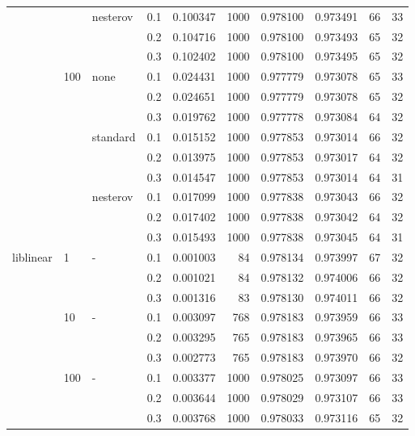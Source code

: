 \begin{table}[H]
\begin{tabular}{llllrrrrrr}
          &     & nesterov & 0.1 &  0.100347 &    1000 &  0.978100 &  0.973491 &          66 &        33 \\
          &     &   & 0.2 &  0.104716 &    1000 &  0.978100 &  0.973493 &          65 &        32 \\
          &     &   & 0.3 &  0.102402 &    1000 &  0.978100 &  0.973495 &          65 &        32 \\
          & 100 & none & 0.1 &  0.024431 &    1000 &  0.977779 &  0.973078 &          65 &        33 \\
          &     &   & 0.2 &  0.024651 &    1000 &  0.977779 &  0.973078 &          65 &        32 \\
          &     &   & 0.3 &  0.019762 &    1000 &  0.977778 &  0.973084 &          64 &        32 \\
          &     & standard & 0.1 &  0.015152 &    1000 &  0.977853 &  0.973014 &          66 &        32 \\
          &     &   & 0.2 &  0.013975 &    1000 &  0.977853 &  0.973017 &          64 &        32 \\
          &     &   & 0.3 &  0.014547 &    1000 &  0.977853 &  0.973014 &          64 &        31 \\
          &     & nesterov & 0.1 &  0.017099 &    1000 &  0.977838 &  0.973043 &          66 &        32 \\
          &     &   & 0.2 &  0.017402 &    1000 &  0.977838 &  0.973042 &          64 &        32 \\
          &     &   & 0.3 &  0.015493 &    1000 &  0.977838 &  0.973045 &          64 &        31 \\
liblinear & 1   & - & 0.1 &  0.001003 &      84 &  0.978134 &  0.973997 &          67 &        32 \\
          &     &   & 0.2 &  0.001021 &      84 &  0.978132 &  0.974006 &          66 &        32 \\
          &     &   & 0.3 &  0.001316 &      83 &  0.978130 &  0.974011 &          66 &        32 \\
          & 10  & - & 0.1 &  0.003097 &     768 &  0.978183 &  0.973959 &          66 &        33 \\
          &     &   & 0.2 &  0.003295 &     765 &  0.978183 &  0.973965 &          66 &        33 \\
          &     &   & 0.3 &  0.002773 &     765 &  0.978183 &  0.973970 &          66 &        32 \\
          & 100 & - & 0.1 &  0.003377 &    1000 &  0.978025 &  0.973097 &          66 &        33 \\
          &     &   & 0.2 &  0.003644 &    1000 &  0.978029 &  0.973107 &          66 &        33 \\
          &     &   & 0.3 &  0.003768 &    1000 &  0.978033 &  0.973116 &          65 &        32 \\
\bottomrule
\end{tabular}
\end{table}

